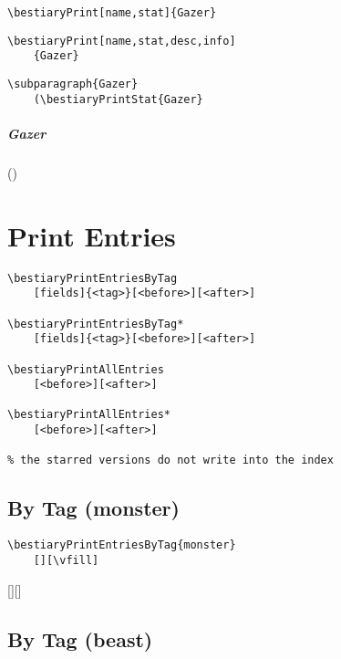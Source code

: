 \documentclass[itdr]{subfiles}
\begin{document}

\vfill

\begin{lstlisting}
\bestiaryPrint[name,stat]{Gazer}
\end{lstlisting}


\vfill
\break

\begin{lstlisting}
\bestiaryPrint[name,stat,desc,info]
	{Gazer}
\end{lstlisting}


\begin{lstlisting}
\subparagraph{Gazer}
	(\bestiaryPrintStat{Gazer}
\end{lstlisting}

\subparagraph{Gazer} ()

\vfill
\clearpage

\section{Print Entries}

\begin{lstlisting}
\bestiaryPrintEntriesByTag
	[fields]{<tag>}[<before>][<after>]

\bestiaryPrintEntriesByTag*
	[fields]{<tag>}[<before>][<after>]

\bestiaryPrintAllEntries
	[<before>][<after>]

\bestiaryPrintAllEntries*
	[<before>][<after>]

% the starred versions do not write into the index
\end{lstlisting}

\subsection{By Tag (monster)}

\begin{lstlisting}
\bestiaryPrintEntriesByTag{monster}
	[][\vfill]
\end{lstlisting}

[][\vfill]


\subsection{By Tag (beast)}
\end{document}
